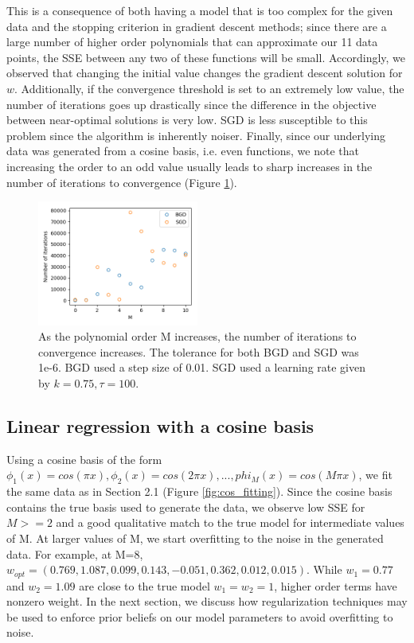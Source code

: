 \documentclass[10pt, twocolumn]{article}
\begin{document}
This is a consequence of both having a model that is too complex for the given data and the stopping criterion in gradient descent methods; since there are a large number of higher order polynomials that can approximate our 11 data points, the SSE between any two of these functions will be small. Accordingly, we observed that changing the initial value changes the gradient descent solution for $w$. Additionally, if the convergence threshold is set to an extremely low value, the number of iterations goes up drastically since the difference in the objective between near-optimal solutions is very low. SGD is less susceptible to this problem since the algorithm is inherently noiser. Finally, since our underlying data was generated from a cosine basis, i.e. even functions, we note that increasing the order to an odd value usually leads to sharp increases in the number of iterations to convergence (Figure \ref{fig:iter_vs_M}).

\begin{figure}
\caption{As the polynomial order M increases, the number of iterations to convergence increases. The tolerance for both BGD and SGD was 1e-6. BGD used a step size of 0.01. SGD used a learning rate given by $k=0.75, \tau=100$.}
\begin{center}
\includegraphics[width=200px]{iter_vs_M}
\end{center}
\label{fig:iter_vs_M}
\end{figure}

\subsection{Linear regression with a cosine basis}

Using a cosine basis of the form $\phi_1(x) = cos(\pi x), \phi_2(x) = cos(2\pi x), ... , phi_M(x) = cos(M\pi x)$, we fit the same data as in Section 2.1 (Figure \ref{fig:cos_fitting}). Since the cosine basis contains the true basis used to generate the data, we observe low SSE for $M>=2$ and a good qualitative match to the true model for intermediate values of M. At larger values of M, we start overfitting to the noise in the generated data. For example, at M=8, $w_{opt} =  (0.769, 1.087, 0.099, 0.143, -0.051, 0.362, 0.012, 0.015) $. While $w_1=0.77$ and $w_2=1.09$ are close to the true model $w_1 = w_2 = 1$, higher order terms have nonzero weight. In the next section, we discuss how regularization techniques may be used to enforce prior beliefs on our model parameters to avoid overfitting to noise.
\end{document}
